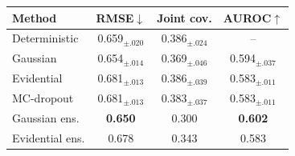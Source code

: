 \begin{tabular}{lccc}
\toprule
Method & RMSE$\downarrow$ & Joint cov. & AUROC$\uparrow$ \\
\midrule
Deterministic & 0.659$_{\pm.020}$ & 0.386$_{\pm.024}$ & -- \\
Gaussian & 0.654$_{\pm.014}$ & 0.369$_{\pm.046}$ & 0.594$_{\pm.037}$ \\
Evidential & 0.681$_{\pm.013}$ & 0.386$_{\pm.039}$ & 0.583$_{\pm.011}$ \\
MC-dropout & 0.681$_{\pm.013}$ & 0.383$_{\pm.037}$ & 0.583$_{\pm.011}$ \\
Gaussian ens. & \textbf{0.650} & 0.300 & \textbf{0.602} \\
Evidential ens. & 0.678 & 0.343 & 0.583 \\
\bottomrule
\end{tabular}
